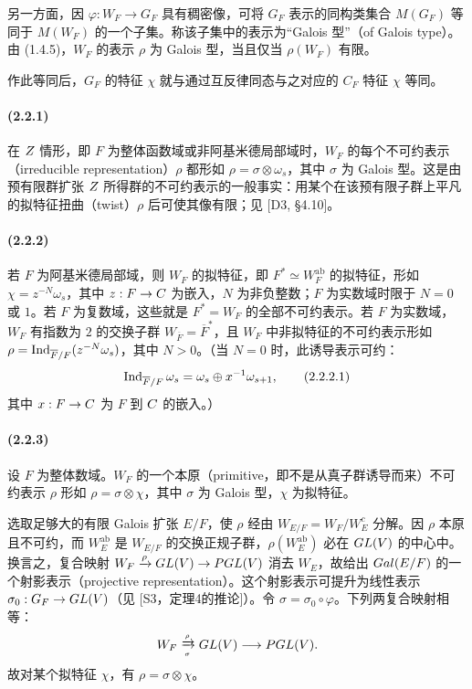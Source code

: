 另一方面，因 $\varphi:W_F\to G_F$ 具有稠密像，可将 $G_F$ 表示的同构类集合 $M(G_F)$ 等同于 $M(W_F)$ 的一个子集。称该子集中的表示为“Galois 型”（of Galois type）。由 (1.4.5)，$W_F$ 的表示 $\rho$ 为 Galois 型，当且仅当 $\rho(W_F)$ 有限。

作此等同后，$G_F$ 的特征 $\chi$ 就与通过互反律同态与之对应的 $C_F$ 特征 $\chi$ 等同。

\paragraph*{(2.2.1)} 在 $Z$ 情形，即 $F$ 为整体函数域或非阿基米德局部域时，$W_F$ 的每个不可约表示（irreducible representation）$\rho$ 都形如 $\rho=\sigma\otimes\omega_s$，其中 $\sigma$ 为 Galois 型。这是由预有限群扩张 $Z$ 所得群的不可约表示的一般事实：用某个在该预有限子群上平凡的拟特征扭曲（twist）$\rho$ 后可使其像有限；见 [D3, §4.10]。

\paragraph*{(2.2.2)} 若 $F$ 为阿基米德局部域，则 $W_F$ 的拟特征，即 $F^*\simeq W_F^{\mathrm{ab}}$ 的拟特征，形如 $\chi=z^{-N}\omega_s$，其中 $z:F\to C$ 为嵌入，$N$ 为非负整数；$F$ 为实数域时限于 $N=0$ 或 $1$。若 $F$ 为复数域，这些就是 $F^*=W_F$ 的全部不可约表示。若 $F$ 为实数域，$W_F$ 有指数为 $2$ 的交换子群 $W_{\overline F}=\overline F^*$，且 $W_F$ 中非拟特征的不可约表示形如 $\rho=\Ind_{\overline F/F}(z^{-N}\omega_s)$，其中 $N>0$。（当 $N=0$ 时，此诱导表示可约：
\begin{equation}
 \Ind_{\overline F/F}\omega_s=\omega_s\oplus x^{-1}\omega_{s+1},\tag{2.2.2.1}
\end{equation}
其中 $x:F\to C$ 为 $F$ 到 $C$ 的嵌入。）

\paragraph*{(2.2.3)} 设 $F$ 为整体数域。$W_F$ 的一个本原（primitive，即不是从真子群诱导而来）不可约表示 $\rho$ 形如 $\rho=\sigma\otimes\chi$，其中 $\sigma$ 为 Galois 型，$\chi$ 为拟特征。

选取足够大的有限 Galois 扩张 $E/F$，使 $\rho$ 经由 $W_{E/F}=W_F/W_E^c$ 分解。因 $\rho$ 本原且不可约，而 $W_E^{\mathrm{ab}}$ 是 $W_{E/F}$ 的交换正规子群，$\rho(W_E^{\mathrm{ab}})$ 必在 $GL(V)$ 的中心中。换言之，复合映射 $W_F\xrightarrow{\rho}GL(V)\to PGL(V)$ 消去 $W_E$，故给出 $Gal(E/F)$ 的一个射影表示（projective representation）。这个射影表示可提升为线性表示 $\sigma_0:G_F\to GL(V)$（见 [S3，定理4的推论]）。令 $\sigma=\sigma_0\circ\varphi$。下列两复合映射相等：
\[
 W_F\mathrel{\substack{\xrightarrow{\rho}\\[-3pt]\xrightarrow[\sigma]{}}}GL(V)\longrightarrow PGL(V).
\]
故对某个拟特征 $\chi$，有 $\rho=\sigma\otimes\chi$。

